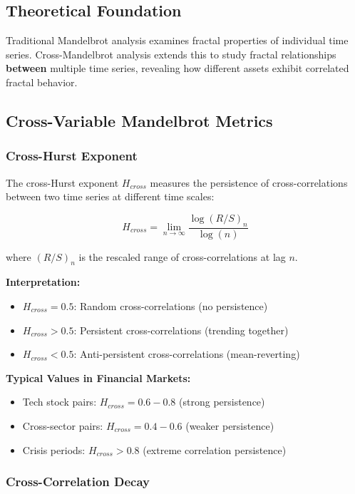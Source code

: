 \documentclass[11pt,a4paper]{article}
\begin{document}
\subsection{Theoretical Foundation}

Traditional Mandelbrot analysis examines fractal properties of individual time series. Cross-Mandelbrot analysis extends this to study fractal relationships \textbf{between} multiple time series, revealing how different assets exhibit correlated fractal behavior.

\subsection{Cross-Variable Mandelbrot Metrics}

\subsubsection{Cross-Hurst Exponent}

The cross-Hurst exponent $H_{cross}$ measures the persistence of cross-correlations between two time series at different time scales:

\begin{equation}
H_{cross} = \lim_{n \to \infty} \frac{\log(R/S)_n}{\log(n)}
\end{equation}

where $(R/S)_n$ is the rescaled range of cross-correlations at lag $n$.

\textbf{Interpretation:}
\begin{itemize}
    \item $H_{cross} = 0.5$: Random cross-correlations (no persistence)
    \item $H_{cross} > 0.5$: Persistent cross-correlations (trending together)
    \item $H_{cross} < 0.5$: Anti-persistent cross-correlations (mean-reverting)
\end{itemize}

\textbf{Typical Values in Financial Markets:}
\begin{itemize}
    \item Tech stock pairs: $H_{cross} = 0.6-0.8$ (strong persistence)
    \item Cross-sector pairs: $H_{cross} = 0.4-0.6$ (weaker persistence)
    \item Crisis periods: $H_{cross} > 0.8$ (extreme correlation persistence)
\end{itemize}

\subsubsection{Cross-Correlation Decay}
\end{document}
